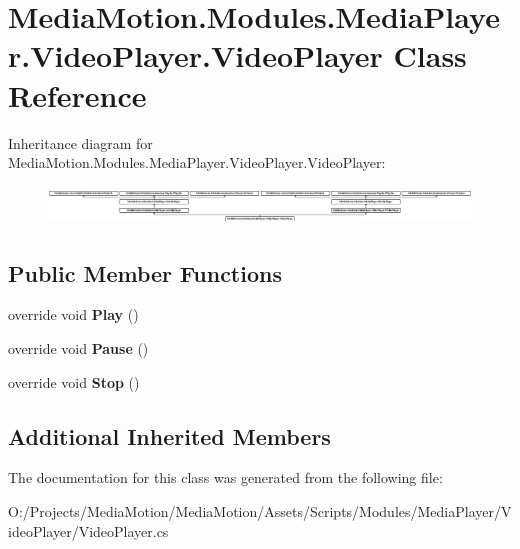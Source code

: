 \hypertarget{class_media_motion_1_1_modules_1_1_media_player_1_1_video_player_1_1_video_player}{\section{Media\+Motion.\+Modules.\+Media\+Player.\+Video\+Player.\+Video\+Player Class Reference}
\label{class_media_motion_1_1_modules_1_1_media_player_1_1_video_player_1_1_video_player}
}
Inheritance diagram for Media\+Motion.\+Modules.\+Media\+Player.\+Video\+Player.\+Video\+Player\+:\begin{figure}[H]
\begin{center}
\leavevmode
\includegraphics[height=1.003584cm]{class_media_motion_1_1_modules_1_1_media_player_1_1_video_player_1_1_video_player}
\end{center}
\end{figure}
\subsection*{Public Member Functions}
\begin{DoxyCompactItemize}
\item 
\hypertarget{class_media_motion_1_1_modules_1_1_media_player_1_1_video_player_1_1_video_player_af73fa88a47e81aad8f22de016af2d2cc}{override void {\bfseries Play} ()}\label{class_media_motion_1_1_modules_1_1_media_player_1_1_video_player_1_1_video_player_af73fa88a47e81aad8f22de016af2d2cc}

\item 
\hypertarget{class_media_motion_1_1_modules_1_1_media_player_1_1_video_player_1_1_video_player_ac39e814e464f19810c70311b90142ba0}{override void {\bfseries Pause} ()}\label{class_media_motion_1_1_modules_1_1_media_player_1_1_video_player_1_1_video_player_ac39e814e464f19810c70311b90142ba0}

\item 
\hypertarget{class_media_motion_1_1_modules_1_1_media_player_1_1_video_player_1_1_video_player_ae10124ec1557936c846c565ca39da1c0}{override void {\bfseries Stop} ()}\label{class_media_motion_1_1_modules_1_1_media_player_1_1_video_player_1_1_video_player_ae10124ec1557936c846c565ca39da1c0}

\end{DoxyCompactItemize}
\subsection*{Additional Inherited Members}


The documentation for this class was generated from the following file\+:\begin{DoxyCompactItemize}
\item 
O\+:/\+Projects/\+Media\+Motion/\+Media\+Motion/\+Assets/\+Scripts/\+Modules/\+Media\+Player/\+Video\+Player/Video\+Player.\+cs\end{DoxyCompactItemize}
